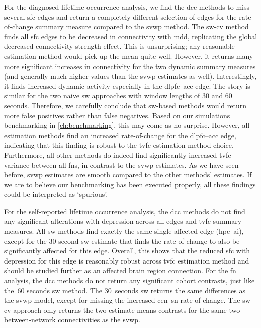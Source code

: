 For the diagnosed lifetime occurrence analysis, we find the \gls{dcc} methods to miss several \gls{sfc} edges and return a completely different selection of edges for the rate-of-change summary measure compared to the \gls{svwp} method.
%
The \gls{sw-cv} method finds all \gls{sfc} edges to be decreased in connectivity with \gls{mdd}, replicating the global decreased connectivity strength effect.
This is unsurprising; any reasonable estimation method would pick up the mean quite well.
However, it returns many more significant increases in connectivity for the two dynamic summary measures (and generally much higher values than the \gls{svwp} estimates as well).
Interestingly, it finds increased dynamic activity especially in the \gls{dlpfc}--\gls{acc} edge.
%
The story is similar for the two naive \gls{sw} approaches with window lengths of 30 and 60 seconds.
Therefore, we carefully conclude that \gls{sw}-based methods would return more false positives rather than false negatives.
Based on our simulations benchmarking in \cref{ch:benchmarking}, this may come as no surprise.
%
However, all estimation methods find an increased rate-of-change for the \gls{dlpfc}--\gls{acc} edge, indicating that this finding is robust to the \gls{tvfc} estimation method choice.
%
Furthermore, all other methods do indeed find significantly increased \gls{tvfc} variance between all \glspl{fn}, in contrast to the \gls{svwp} estimates.
As we have seen before, \gls{svwp} estimates are smooth compared to the other methods' estimates.
If we are to believe our benchmarking has been executed properly, all these findings could be interpreted as `spurious'.

For the self-reported lifetime occurrence analysis, the \gls{dcc} methods do not find any significant alterations with depression across all edges and \gls{tvfc} summary measures.
%
All \gls{sw} methods find exactly the same single affected edge (\gls{hpc}--\gls{ai}), except for the 30-second \gls{sw} estimate that finds the rate-of-change to also be significantly affected for this edge.
%
Overall, this shows that the reduced \gls{sfc} with depression for this edge is reasonably robust across \gls{tvfc} estimation method and should be studied further as an affected brain region connection.
%
For the \gls{fn} analysis, the \gls{dcc} methods do not return any significant cohort contrasts, just like the~60 seconds \gls{sw} method.
The 30~seconds \gls{sw} returns the same differences as the \gls{svwp} model, except for missing the increased \gls{cen}--\gls{sn} rate-of-change.
The \gls{sw-cv} approach only returns the two estimate means contrasts for the same two between-network connectivities as the \gls{svwp}.

